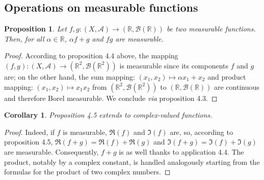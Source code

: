 \documentclass[11pt]{article}
\newtheorem{proposition}{Proposition}[section]
\newtheorem{corollary}{Corollary}[section]
\theoremstyle{definition}
\begin{document}
\subsection{Operations on measurable functions}

\begin{proposition}
    Let $f, g : (X, \mathscr{A}) \to (\mathbb{R}, \mathscr{B}(\mathbb{R}))$ be two measurable functions. Then, for all $\alpha \in \mathbb{R}$, $\alpha f + g$ and $f g$ are measurable.
\end{proposition}
\begin{proof}
    According to proposition 4.4 above, the mapping $(f, g) : (X, \mathscr{A}) \to (\mathbb{R}^2, \mathscr{B}(\mathbb{R}^2))$ is measurable since its components $f$ and $g$ are; on the other hand, the sum mapping: $(x_1, x_2) \mapsto \alpha x_1 + x_2$ and product mapping: $(x_1, x_2) \mapsto x_1 x_2$ from $(\mathbb{R}^2, \mathscr{B}(\mathbb{R}^2))$ to $(\mathbb{R}, \mathscr{B}(\mathbb{R}))$ are continuous and therefore Borel measurable. We conclude \textit{via} proposition 4.3. 
\end{proof}

\begin{corollary}
    Proposition 4.5 extends to complex-valued functions.
\end{corollary}
\begin{proof}
    Indeed, if $f$ is measurable, $\Re(f)$ and $\Im(f)$ are, so, according to proposition 4.5, $\Re(f+g) = \Re(f) + \Re(g)$ and $\Im(f+g) = \Im(f) + \Im(g)$ are measurable. Consequently, $f+g$ is as well thanks to application 4.4. The product, notably by a complex constant, is handled analogously starting from the formulas for the product of two complex numbers. 
\end{proof}
\end{document}
